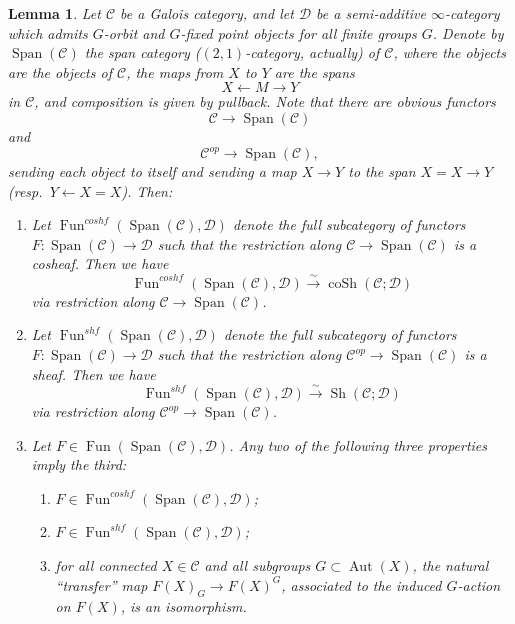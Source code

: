 \documentclass[12pt]{article}
\newtheorem{lemma}[theorem]{Lemma}
\theoremstyle{definition}
\newcommand{\on}{\operatorname}
\newcommand{\mc}{\mathcal}
\begin{document}
\begin{lemma}\label{transferlemma}
Let $\mc{C}$ be a Galois category, and let $\mc{D}$ be a semi-additive $\infty$-category which admits $G$-orbit and $G$-fixed point objects for all finite groups $G$.  Denote by $\on{Span}(\mc{C})$ the span category ($(2,1)$-category, actually) of $\mc{C}$, where the objects are the objects of $\mc{C}$, the maps from $X$ to $Y$ are the spans
$$X \leftarrow M \to Y$$
in $\mc{C}$, and composition is given by pullback.  Note that there are obvious functors
$$\mc{C} \to \on{Span}(\mc{C})$$
and
$$\mc{C}^{op} \to \on{Span}(\mc{C}),$$
sending each object to itself and sending a map $X\to Y$ to the span $X=X\to Y$ (resp.\ $Y\leftarrow X=X$). Then:

\begin{enumerate}
\item Let $\on{Fun}^{coshf}(\on{Span}(\mc{C}),\mc{D})$ denote the full subcategory of functors $F:\on{Span}(\mc{C})\to \mc{D}$ such that the restriction along $\mc{C}\to \on{Span}(\mc{C})$ is a cosheaf.  Then we have
$$\on{Fun}^{coshf}(\on{Span}(\mc{C}),\mc{D})\overset{\sim}{\rightarrow}\on{coSh}(\mc{C};\mc{D})$$
via restriction along $\mc{C} \to \on{Span}(\mc{C})$.
\item Let $\on{Fun}^{shf}(\on{Span}(\mc{C}),\mc{D})$ denote the full subcategory of functors $F:\on{Span}(\mc{C})\to \mc{D}$ such that the restriction along $\mc{C}^{op}\to \on{Span}(\mc{C})$ is a sheaf.  Then we have
$$\on{Fun}^{shf}(\on{Span}(\mc{C}),\mc{D})\overset{\sim}{\rightarrow}\on{Sh}(\mc{C};\mc{D})$$
via restriction along $\mc{C}^{op} \to \on{Span}(\mc{C})$.
\item Let $F \in \on{Fun}(\on{Span}(\mc{C}),\mc{D})$.  Any two of the following three properties imply the third:
\begin{enumerate}
\item $F\in \on{Fun}^{coshf}(\on{Span}(\mc{C}),\mc{D})$;
\item $F\in \on{Fun}^{shf}(\on{Span}(\mc{C}),\mc{D})$;
\item for all connected $X\in\mc{C}$ and all subgroups $G\subset \on{Aut}(X)$, the natural ``transfer'' map $F(X)_G \to F(X)^G$, associated to the induced $G$-action on $F(X)$, is an isomorphism.
\end{enumerate}
\end{enumerate}
\end{lemma}
\end{document}

